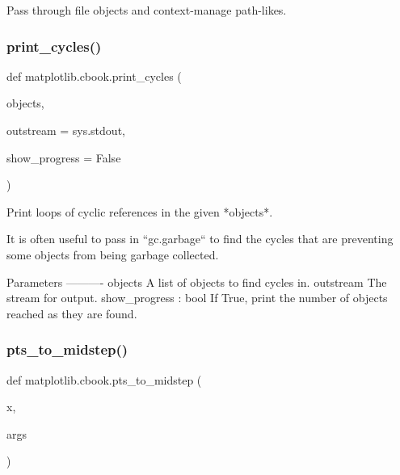 \begin{DoxyVerb}Pass through file objects and context-manage path-likes.\end{DoxyVerb}
 \mbox{\label{namespacematplotlib_1_1cbook_ad14ca04fafb21b27932fe178ee5d32b6}} 
\subsubsection{\texorpdfstring{print\+\_\+cycles()}{print\_cycles()}}
{\footnotesize\ttfamily def matplotlib.\+cbook.\+print\+\_\+cycles (\begin{DoxyParamCaption}\item[{}]{objects,  }\item[{}]{outstream = {\ttfamily sys.stdout},  }\item[{}]{show\+\_\+progress = {\ttfamily False} }\end{DoxyParamCaption})}

\begin{DoxyVerb}Print loops of cyclic references in the given *objects*.

It is often useful to pass in ``gc.garbage`` to find the cycles that are
preventing some objects from being garbage collected.

Parameters
----------
objects
    A list of objects to find cycles in.
outstream
    The stream for output.
show_progress : bool
    If True, print the number of objects reached as they are found.
\end{DoxyVerb}
 \mbox{\label{namespacematplotlib_1_1cbook_abf6af67829ca61096a331b8f8294e729}} 
\subsubsection{\texorpdfstring{pts\+\_\+to\+\_\+midstep()}{pts\_to\_midstep()}}
{\footnotesize\ttfamily def matplotlib.\+cbook.\+pts\+\_\+to\+\_\+midstep (\begin{DoxyParamCaption}\item[{}]{x,  }\item[{}]{args }\end{DoxyParamCaption})}

